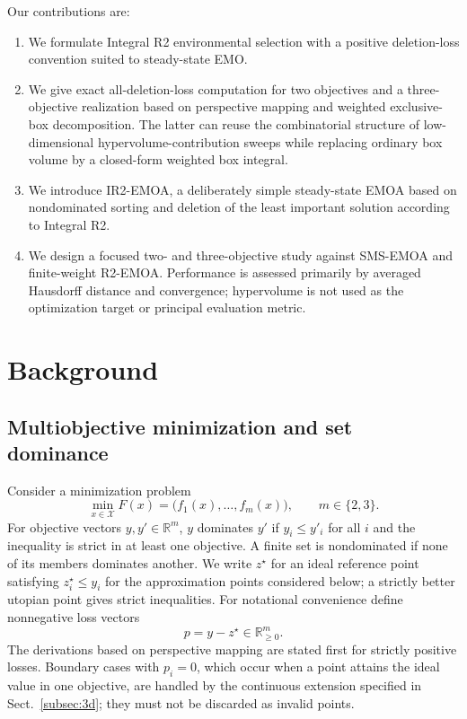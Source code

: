 \documentclass[runningheads]{llncs}
\newcommand{\R}{\mathbb{R}}
\begin{document}
Our contributions are:
\begin{enumerate}
    \item We formulate Integral R2 environmental selection with a positive deletion-loss convention suited to steady-state EMO.
    \item We give exact all-deletion-loss computation for two objectives and a three-objective realization based on perspective mapping and weighted exclusive-box decomposition. The latter can reuse the combinatorial structure of low-dimensional hypervolume-contribution sweeps while replacing ordinary box volume by a closed-form weighted box integral.
    \item We introduce IR2-EMOA, a deliberately simple steady-state EMOA based on nondominated sorting and deletion of the least important solution according to Integral R2.
    \item We design a focused two- and three-objective study against SMS-EMOA and finite-weight R2-EMOA. Performance is assessed primarily by averaged Hausdorff distance and convergence; hypervolume is not used as the optimization target or principal evaluation metric.
\end{enumerate}

\section{Background}
\label{sec:background}

\subsection{Multiobjective minimization and set dominance}

Consider a minimization problem
\begin{equation}
    \min_{x\in\mathcal{X}} F(x)
    = \bigl(f_1(x),\ldots,f_m(x)\bigr),
    \qquad m\in\{2,3\}.
\end{equation}
For objective vectors $y,y'\in\R^m$, $y$ dominates $y'$ if $y_i\le y'_i$ for all $i$ and the inequality is strict in at least one objective. A finite set is nondominated if none of its members dominates another. We write $z^\star$ for an ideal reference point satisfying $z_i^\star\le y_i$ for the approximation points considered below; a strictly better utopian point gives strict inequalities. For notational convenience define nonnegative loss vectors
\begin{equation}
    p=y-z^\star\in\R^m_{\ge0}.
\end{equation}
The derivations based on perspective mapping are stated first for strictly positive losses. Boundary cases with $p_i=0$, which occur when a point attains the ideal value in one objective, are handled by the continuous extension specified in Sect.~\ref{subsec:3d}; they must not be discarded as invalid points.
\end{document}
